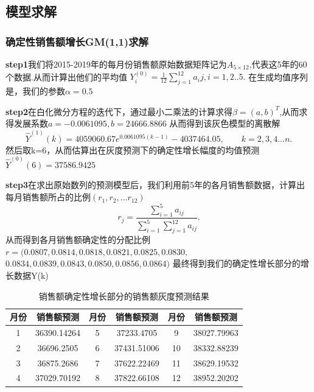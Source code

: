 \documentclass{whutmod}
\begin{document}
	\subsection{模型求解}
	\subsubsection{确定性销售额增长GM(1,1)求解}
	\textbf{step1}我们将2015-2019年的每月份销售额原始数据矩阵记为$A_{5\times12}$,代表这5年的60个数据.从而计算出他们的平均值
	$Y_i^{(0)}=\frac{1}{12}\sum_{j=1}^{12} a_ij,i=1,2..5.$
	在生成均值序列是，我们的参数$\alpha=0.5$
	
	\textbf{step2}在白化微分方程的迭代下，通过最小二乘法的计算求得$\beta=(a,b)^T$,从而求得发展系数$a=-0.0061095,b=24666.8866$
	从而得到该灰色模型的离散解
	\begin{equation}
	\hat Y^{(1)}(k)=4059060.67e^{0.0061095(k-1)}-4037464.05,\qquad k=2,3,4...n.
	\end{equation}
	然后取k=6，从而估算出在灰度预测下的确定性增长幅度的均值预测$\hat{Y}^{(0)}(6)=37586.9425$
	
	\textbf{step3}在求出原始数列的预测模型后，我们利用前5年的各月销售额数据，计算出每月销售额所占的比例$\left( r_1,r_2,...r_{12}\right) $
	\begin{equation}
	r_j=\frac{\sum_{i=1}^5a_{ij}}{\sum_{i=1}^{5}\sum_{j=1}^12a_{ij}}.
	\end{equation}
	从而得到各月销售额确定性的分配比例 
	$r=(0.0807, 	0.0814 ,	0.0818, 	0.0821, 	0.0825, 	0.0830, 	$ \\ $	0.0834, 0.0839 ,	0.0843, 	0.0850, 	0.0856, 	0.0864 ) $
	最终得到我们的确定性增长部分的增长数据Y(k)
	\begin{table}[!htbp]
		\caption{销售额确定性增长部分的销售额灰度预测结果} \centering
		\begin{tabular}{cccccc}
			\toprule[1.5pt]
			月份 & 销售额预测 & 月份 & 销售额预测& 月份 & 销售额预测\\
			\midrule[1pt]
			1 & 36390.14264&	5 &37233.4705 &9&	38027.79963	\\
			2 &36696.2505&	6 &37431.51006&10&		38332.88239	\\
			3 &36875.2686& 7 &37622.22469	&11&		38629.19532	\\
			4 &37029.70192&	8&	37822.66108 &12&		38952.20202\\	
			\bottomrule[1.5pt]
		\end{tabular}
	\end{table}
	
	
	
\end{document}
